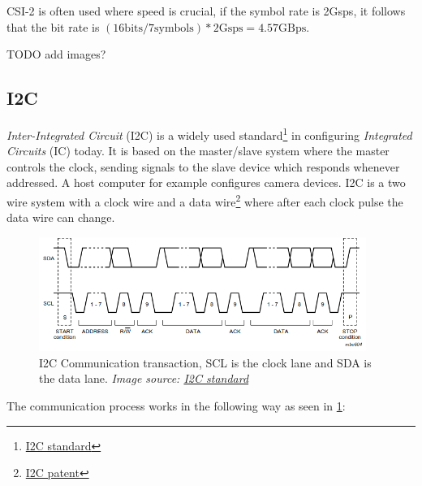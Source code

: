 CSI-2 is often used where speed is crucial, if the symbol rate is 2Gsps,
it follows that the bit rate is
$(16\text{bits} / 7\text{symbols}) * 2\text{Gsps} = 4.57 \text{GBps}$.


TODO add images?
\subsection{I2C}
\textit{Inter-Integrated Circuit} (I2C) is a widely used standard\footnote{\href{https://web.archive.org/web/20221006073143/http://www.nxp.com/docs/en/user-guide/UM10204.pdf}{I2C standard}}
in configuring \textit{Integrated Circuits} (IC) today. It is based on the
master/slave system where the master controls the clock, sending signals to the
slave device which responds whenever addressed. A host computer for example
configures camera devices. I2C is a two wire system with a clock wire and a
data wire\footnote{\href{https://patents.google.com/patent/US4689740A/en}{I2C patent}}
where after each clock pulse the data wire can change.

\begin{figure}
    \begin{center}
        \includegraphics[width=0.95\textwidth]{figures/I2C_transaction.png}
    \end{center}
    \caption{I2C Communication transaction, SCL is the clock lane and SDA is the data lane.
        \textit{Image source: \href{https://www.nxp.com/docs/en/user-guide/UM10204.pdf}{I2C standard}}}\label{fig:I2C}
\end{figure}

The communication process works in the following way as seen in \cref{fig:I2C}:

